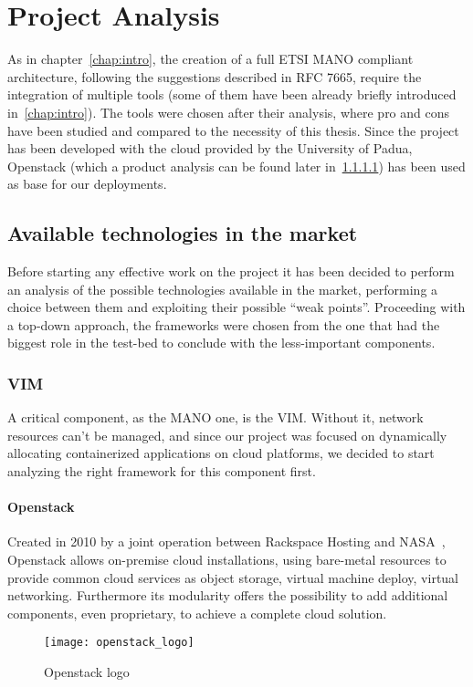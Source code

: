 \chapter{Project Analysis}
\label{chap:prjan}

As in chapter~\ref{chap:intro}, the creation of a full ETSI MANO compliant
architecture, following the suggestions described in RFC 7665, require the
integration of multiple tools (some of them have been already briefly introduced
in~\ref{chap:intro}). The tools were chosen after their analysis, where pro and
cons have been studied and compared to the necessity of this thesis. Since the
project has been developed with the cloud provided by the University of Padua,
Openstack (which a product analysis can be found later
in~\ref{chap:prjan:sec:openstack}) has been used as base for our deployments.

\section{Available technologies in the market} 
\label{chap:prjan:sec:tech}
Before starting any effective work on the project it has been decided to 
perform an analysis of the possible technologies available in the market, 
performing a choice between them and exploiting their possible ``weak 
points''. Proceeding with a top-down approach, the frameworks were chosen from 
the one that had the biggest role in the test-bed to conclude with the 
less-important components.
\subsection{VIM}
A critical component, as the MANO one, is the VIM. Without it, network 
resources can't be managed, and since our project was focused on dynamically 
allocating containerized applications on cloud platforms, we decided to start 
analyzing the right framework for this component first.

\subsubsection{Openstack}
\label{chap:prjan:sec:openstack}
Created in 2010 by a joint operation between Rackspace Hosting and
NASA~\cite{openstackWebsite}, Openstack allows on-premise cloud installations,
using bare-metal resources to provide common cloud services as object storage,
virtual machine deploy, virtual networking. Furthermore its modularity offers
the possibility to add additional components, even proprietary, to achieve a
complete cloud solution.
\begin{figure}[t]
 \centering \texttt{[image: openstack\_logo]}
 \caption{Openstack logo}
 \label{chap:prjan:img:openstack_logo}
\end{figure}


